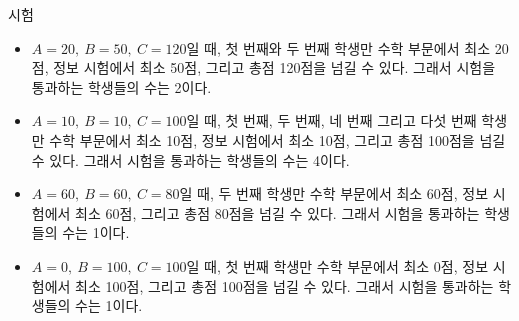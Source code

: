 \begin{problem}{시험}
	\begin{itemize}
		\item $A=20,\ B=50,\ C=120$일 때, 첫 번째와 두 번째 학생만 수학 부문에서 최소 20점, 정보 시험에서 최소 50점, 그리고 총점 120점을 넘길 수 있다. 그래서 시험을 통과하는 학생들의 수는 2이다.
		\item $A=10,\ B=10,\ C=100$일 때, 첫 번째, 두 번째, 네 번째 그리고 다섯 번째 학생만 수학 부문에서 최소 10점, 정보 시험에서 최소 10점, 그리고 총점 100점을 넘길 수 있다. 그래서 시험을 통과하는 학생들의 수는 4이다.
		\item $A=60,\ B=60,\ C=80$일 때, 두 번째 학생만 수학 부문에서 최소 60점, 정보 시험에서 최소 60점, 그리고 총점 80점을 넘길 수 있다. 그래서 시험을 통과하는 학생들의 수는 1이다.
		\item $A=0,\ B=100,\ C=100$일 때, 첫 번째 학생만 수학 부문에서 최소 0점, 정보 시험에서 최소 100점, 그리고 총점 100점을 넘길 수 있다. 그래서 시험을 통과하는 학생들의 수는 1이다.
	\end{itemize}
	
\end{problem}

